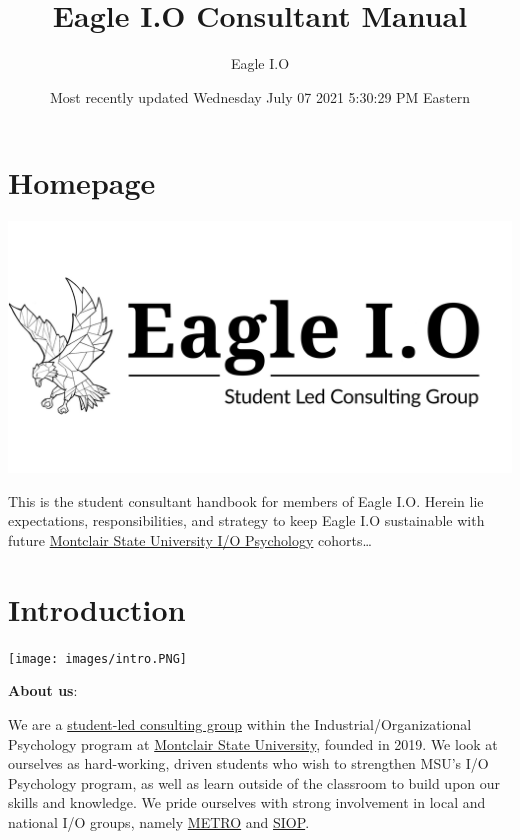 \documentclass[
]{book}
\title{Eagle I.O Consultant Manual}
\author{Eagle I.O}
\date{Most recently updated Wednesday July 07 2021 5:30:29 PM Eastern}
\begin{document}
\maketitle

{
\setcounter{tocdepth}{4}
\tableofcontents
}
\hypertarget{homepage}{%
\chapter*{Homepage}\label{homepage}}

\includegraphics{images/eagleio dot.jpg}

This is the student consultant handbook for members of Eagle I.O. Herein lie expectations, responsibilities, and strategy to keep Eagle I.O sustainable with future \href{https://www.montclair.edu/psychology/graduate-programs/industrial-organizational-psychology/}{Montclair State University I/O Psychology} cohorts\ldots{}

\hypertarget{introduction}{%
\chapter{Introduction}\label{introduction}}

\texttt{[image: images/intro.PNG]}

\textbf{About us}:

We are a \href{https://eagle-io.weebly.com/}{student-led consulting group} within the Industrial/Organizational Psychology program at \href{https://www.montclair.edu/psychology/graduate-programs/industrial-organizational-psychology/}{Montclair State University}, founded in 2019. We look at ourselves as hard-working, driven students who wish to strengthen MSU's I/O Psychology program, as well as learn outside of the classroom to build upon our skills and knowledge. We pride ourselves with strong involvement in local and national I/O groups, namely \href{https://metroapppsych.com/}{METRO} and \href{https://siop.org}{SIOP}.
\end{document}
